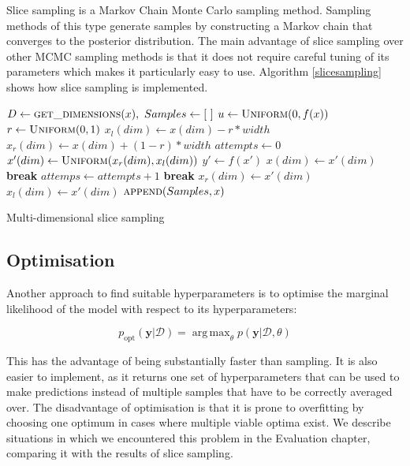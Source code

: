 \documentclass[a4paper,12pt,twoside,openright]{report}
\newcommand{\Break}{\State \textbf{break} }
\DeclareMathOperator*{\argmax}{arg\,max}
\begin{document}
Slice sampling \cite{MacKay:2002:ITI:971143, neal2003} is a Markov Chain Monte Carlo sampling method. Sampling methods of this type generate samples by constructing a Markov chain that converges to the posterior distribution. The main advantage of slice sampling over other MCMC sampling methods is that it does not require careful tuning of its parameters which makes it particularly easy to use. Algorithm \ref{slicesampling} shows how slice sampling is implemented.


\begin{algorithm}
\begin{algorithmic}[1]
\State $D\gets \Call{get\_dimensions}{x},\ Samples\gets[\ ]$
\State $u\gets \Call{Uniform}{0, f(x)}$
\State $r\gets \Call{Uniform}{0, 1}$
\State $x_l(dim)\gets x(dim) - r * width$
\State $x_r(dim)\gets x(dim) + (1 - r) * width$
\State $attempts\gets 0$
\Loop
\State $x'(dim) \gets \Call{Uniform}{x_r(dim), x_l(dim)}$
\State $y'\gets f(x')$
  \State $x(dim)\gets x'(dim)$
  \Break
\Else
  \State $attemps \gets attempts + 1$
    \Break
    \State $x_r(dim) \gets x'(dim)$
    \State $x_l(dim) \gets x'(dim)$
  \EndIf
\EndIf
\EndLoop
\EndFor
\State $\Call{append}{Samples, x}$
\EndFor
\EndProcedure
\end{algorithmic}
\caption{Multi-dimensional slice sampling}
\label{slicesampling}
\end{algorithm}



\subsection{Optimisation}
Another approach to find suitable hyperparameters is to optimise the marginal likelihood of the model with respect to its hyperparameters:

\begin{equation}
p_{\text{opt}}(\mathbf{y}|\mathcal{D}) = \argmax_\theta p(\mathbf{y}|\mathcal{D}, \theta)
\end{equation}


This has the advantage of being substantially faster than sampling. It is also easier to implement, as it returns one set of hyperparameters that can be used to make predictions instead of multiple samples that have to be correctly averaged over. The disadvantage of optimisation is that it is prone to overfitting by choosing one optimum in cases where multiple viable optima exist. We describe situations in which we encountered this problem in the Evaluation chapter, comparing it with the results of slice sampling.
\end{document}
